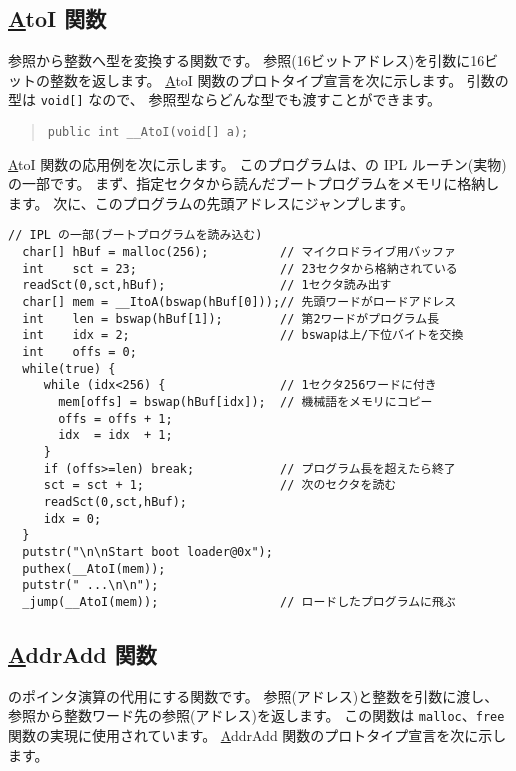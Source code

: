 \subsection{\ul \ul AtoI 関数}

参照から整数へ型を変換する関数です。
参照(16ビットアドレス)を引数に16ビットの整数を返します。
\ul \ul AtoI 関数のプロトタイプ宣言を次に示します。
引数の型は \verb/void[]/ なので、
参照型ならどんな型でも渡すことができます。

\begin{quote}
\begin{verbatim}
public int __AtoI(void[] a);
\end{verbatim}
\end{quote}

\ul \ul AtoI 関数の応用例を次に示します。
このプログラムは、\tac の IPL ルーチン(実物)の一部です。
まず、指定セクタから読んだブートプログラムをメモリに格納します。
次に、このプログラムの先頭アドレスにジャンプします。

\begin{mylist}
\begin{verbatim}
// IPL の一部(ブートプログラムを読み込む)
  char[] hBuf = malloc(256);          // マイクロドライブ用バッファ
  int    sct = 23;                    // 23セクタから格納されている
  readSct(0,sct,hBuf);                // 1セクタ読み出す
  char[] mem = __ItoA(bswap(hBuf[0]));// 先頭ワードがロードアドレス
  int    len = bswap(hBuf[1]);        // 第2ワードがプログラム長
  int    idx = 2;                     // bswapは上/下位バイトを交換
  int    offs = 0;
  while(true) {
     while (idx<256) {                // 1セクタ256ワードに付き
       mem[offs] = bswap(hBuf[idx]);  // 機械語をメモリにコピー
       offs = offs + 1;
       idx  = idx  + 1;
     }
     if (offs>=len) break;            // プログラム長を超えたら終了
     sct = sct + 1;                   // 次のセクタを読む
     readSct(0,sct,hBuf);
     idx = 0;
  }
  putstr("\n\nStart boot loader@0x");
  puthex(__AtoI(mem));
  putstr(" ...\n\n");
  _jump(__AtoI(mem));                 // ロードしたプログラムに飛ぶ
\end{verbatim}
\end{mylist}

\subsection{\ul \ul AddrAdd 関数}

\cl のポインタ演算の代用にする関数です。
参照(アドレス)と整数を引数に渡し、
参照から整数ワード先の参照(アドレス)を返します。
この関数は \verb/malloc/、\verb/free/ 関数の実現に使用されています。
\ul \ul AddrAdd 関数のプロトタイプ宣言を次に示します。

